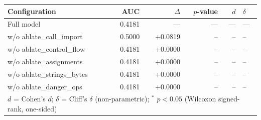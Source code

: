 \begin{tabular}{lrrrrl}
\toprule
Configuration & AUC & $\Delta$ & $p$-value & $d$ & $\delta$ \\
\midrule
Full model & 0.4181 & --- & --- & --- & --- \\
\quad w/o ablate\_call\_import & 0.5000 & +0.0819 & -- & -- & -- \\
\quad w/o ablate\_control\_flow & 0.4181 & +0.0000 & -- & -- & -- \\
\quad w/o ablate\_assignments & 0.4181 & +0.0000 & -- & -- & -- \\
\quad w/o ablate\_strings\_bytes & 0.4181 & +0.0000 & -- & -- & -- \\
\quad w/o ablate\_danger\_ops & 0.4181 & +0.0000 & -- & -- & -- \\
\bottomrule
\multicolumn{6}{l}{\footnotesize $d$ = Cohen's $d$;\; $\delta$ = Cliff's $\delta$ (non-parametric); $^{*}$ $p < 0.05$ (Wilcoxon signed-rank, one-sided)}
\end{tabular}